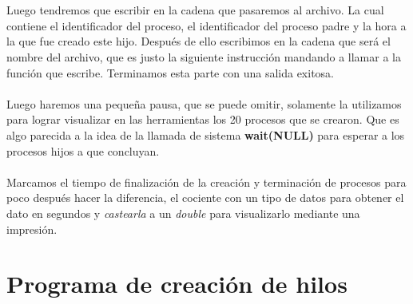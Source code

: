 \documentclass[10pt]{article}
\begin{document}
	\\\\
	Luego tendremos que escribir en la cadena que pasaremos al archivo. La cual contiene el identificador del proceso, el identificador del proceso padre  y la hora a la que fue creado este hijo. Después de ello escribimos en la cadena que será el nombre del archivo, que es justo la siguiente instrucción mandando a llamar a la función que escribe. Terminamos esta parte con una salida exitosa. 
	\\\\
	Luego haremos una pequeña pausa, que se puede omitir, solamente la utilizamos para lograr visualizar en las herramientas los 20 procesos que se crearon. Que es algo parecida a la idea de la llamada de sistema \textbf{wait(NULL)} para esperar a los procesos hijos a que concluyan. 
	\\\\
	Marcamos el tiempo de finalización de la creación y terminación de procesos para poco después hacer la diferencia, el cociente con un tipo de datos para obtener el dato en segundos y \emph{castearla} a un \textit{double} para visualizarlo mediante una impresión. 
	\section{Programa de creación de hilos}
\end{document}
